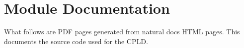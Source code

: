\documentclass[usletter]{article}
\begin{document}
  

  \section{Module Documentation}
  \par What follows are PDF pages generated from natural docs HTML pages. This documents
  the source code used for the CPLD.

  

  
\end{document}

